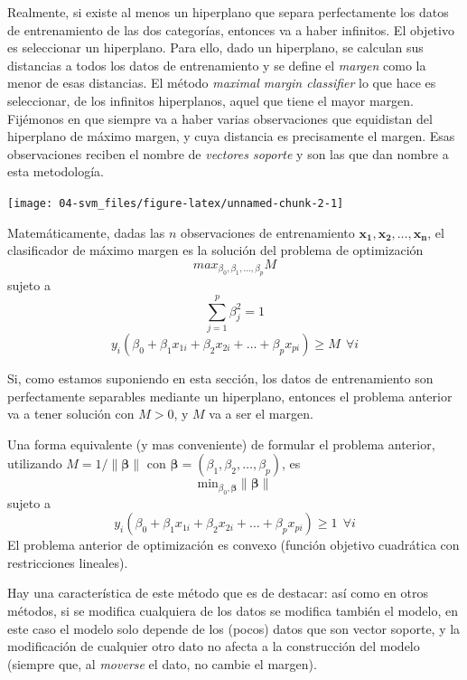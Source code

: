 \documentclass[
  spanish,
]{book}
\theoremstyle{break}
\theoremstyle{definition}
\theoremstyle{definition}
\theoremstyle{definition}
\theoremstyle{definition}
\theoremstyle{remark}
\begin{document}
Realmente, si existe al menos un hiperplano que separa perfectamente los datos de entrenamiento de las dos categorías, entonces va a haber infinitos. El objetivo es seleccionar un hiperplano. Para ello, dado un hiperplano, se calculan sus distancias a todos los datos de entrenamiento y se define el \emph{margen} como la menor de esas distancias. El método \emph{maximal margin classifier} lo que hace es seleccionar, de los infinitos hiperplanos, aquel que tiene el mayor margen. Fijémonos en que siempre va a haber varias observaciones que equidistan del hiperplano de máximo margen, y cuya distancia es precisamente el margen. Esas observaciones reciben el nombre de \emph{vectores soporte} y son las que dan nombre a esta metodología.

\begin{center}\texttt{[image: 04-svm\_files/figure-latex/unnamed-chunk-2-1]} \end{center}

Matemáticamente, dadas las \(n\) observaciones de entrenamiento \(\mathbf{x_1}, \mathbf{x_2}, \ldots, \mathbf{x_n}\), el clasificador de máximo margen es la solución del problema de optimización
\[max_{\beta_0, \beta_1,\ldots, \beta_p} M\]
sujeto a
\[\sum_{j=1}^p \beta_j^2 = 1\]
\[ y_i(\beta_0 + \beta_1 x_{1i} + \beta_2 x_{2i} + \ldots + \beta_p x_{pi}) \ge M \ \ \forall i\]

Si, como estamos suponiendo en esta sección, los datos de entrenamiento son perfectamente separables mediante un hiperplano, entonces el problema anterior va a tener solución con \(M>0\), y \(M\) va a ser el margen.

Una forma equivalente (y mas conveniente) de formular el problema anterior, utilizando \(M = 1/\lVert \boldsymbol{\beta} \rVert\) con \(\boldsymbol{\beta} = (\beta_1, \beta_2, \ldots, \beta_p)\), es
\[\mbox{min}_{\beta_0, \boldsymbol{\beta}} \lVert \boldsymbol{\beta} \rVert\]
sujeto a
\[ y_i(\beta_0 + \beta_1 x_{1i} + \beta_2 x_{2i} + \ldots + \beta_p x_{pi}) \ge 1 \ \ \forall i\]
El problema anterior de optimización es convexo (función objetivo cuadrática con restricciones lineales).

Hay una característica de este método que es de destacar: así como en otros métodos, si se modifica cualquiera de los datos se modifica también el modelo, en este caso el modelo solo depende de los (pocos) datos que son vector soporte, y la modificación de cualquier otro dato no afecta a la construcción del modelo (siempre que, al \emph{moverse} el dato, no cambie el margen).
\end{document}
